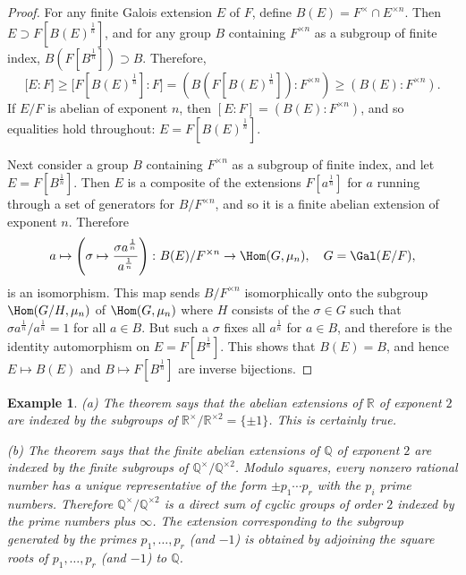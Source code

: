 \documentclass[a4paper,11pt,final,openany]{memoir}
\newtheorem{example}[X]{Example}
\theoremstyle{nonumberplain}
\newtheorem{proof}{Proof.}
\begin{document}
\begin{proof}
For any finite Galois extension $E$ of $F$, define $B(E)=F^{\times}\cap
E^{\times n}$. Then $E\supset F[B(E)^{\frac{1}{n}}]$, and for any group $B$
containing $F^{\times n}$ as a subgroup of finite index, $B(F[B^{\frac{1}{n}%
}])\supset B$. Therefore,
\[
\lbrack E\colon F]\geq\lbrack F[B(E)^{\frac{1}{n}}]\colon F]=(B(F[B(E)^{\frac
{1}{n}}])\colon F^{\times n})\geq(B(E)\colon F^{\times n}).
\]
If $E/F$ is abelian of exponent $n$, then $[E\colon F]=(B(E)\colon F^{\times
n})$, and so equalities hold throughout: $E=F[B(E)^{\frac{1}{n}}]$.

Next consider a group $B$ containing $F^{\times n}$ as a subgroup of finite
index, and let $E=F[B^{\frac{1}{n}}]$. Then $E$ is a composite of the
extensions $F[a^{\frac{1}{n}}]$ for $a$ running through a set of generators
for $B/F^{\times n}$, and so it is a finite abelian extension of exponent $n$.
Therefore
\[
a\mapsto\left(  \sigma\mapsto\frac{\sigma a^{\frac{1}{n}}}{a^{\frac{1}{n}}%
}\right)  \colon B(E)/F^{\times n}\rightarrow\Hom(G,\mu_{n}),\quad
G=\Gal(E/F),
\]
is an isomorphism. This map sends $B/F^{\times n}$ isomorphically onto the
subgroup $\Hom(G/H,\mu_{n})$ of $\Hom(G,\mu_{n})$ where $H$ consists of the
$\sigma\in G$ such that $\sigma a^{\frac{1}{n}}/a^{\frac{1}{n}}=1$ for all
$a\in B$. But such a $\sigma$ fixes all $a^{\frac{1}{n}}$ for $a\in B$, and
therefore is the identity automorphism on $E=F[B^{\frac{1}{n}}]$. This shows
that $B(E)=B$, and hence $E\mapsto B(E)$ and $B\mapsto F[B^{\frac{1}{n}}]$ are
inverse bijections.
\end{proof}

\begin{example}
\label{ag20b}(a) The theorem says that the abelian extensions of $\mathbb{R}$
of exponent $2$ are indexed by the subgroups of $\mathbb{R}^{\times
}/\mathbb{R}^{\times2}=\{\pm1\}$. This is certainly true.

(b) The theorem says that the finite abelian extensions of $\mathbb{Q}$ of
exponent $2$ are indexed by the finite subgroups of $\mathbb{Q}^{\times
}/\mathbb{Q}^{\times2}$. Modulo squares, every nonzero rational number has a
unique representative of the form $\pm p_{1}\cdots p_{r}$ with the $p_{i}$
prime numbers. Therefore $\mathbb{Q}^{\times}/\mathbb{Q}^{\times2}$ is a
direct sum of cyclic groups of order $2$ indexed by the prime numbers plus
$\infty$. The extension corresponding to the subgroup generated by the primes
$p_{1},\ldots,p_{r}$ (and $-1$) is obtained by adjoining the square roots of
$p_{1},\ldots,p_{r}$ (and $-1$) to $\mathbb{Q}{}$.
\end{example}
\end{document}
